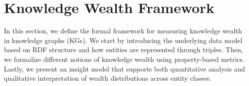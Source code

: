 \section{Knowledge Wealth Framework}


In this section, we define the formal framework for measuring knowledge wealth in knowledge graphs (KGs). We start by introducing the underlying data model based on RDF structure and how entities are represented through triples. Then, we formalize different notions of knowledge wealth using property-based metrics. Lastly, we present an insight model that supports both quantitative analysis and qualitative interpretation of wealth distributions across entity classes.




